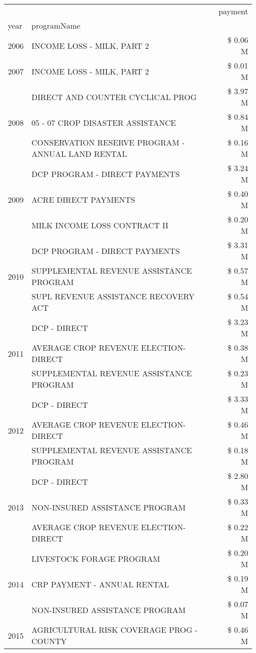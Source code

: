 \begin{tabular}{llr}
\toprule
 &  & payment \\
year & programName &  \\
\midrule
2006 & INCOME LOSS - MILK, PART 2 & \$ 0.06 M \\
\cline{1-3}
2007 & INCOME LOSS - MILK, PART 2 & \$ 0.01 M \\
\cline{1-3}
\multirow[t]{3}{*}{2008} & DIRECT AND COUNTER CYCLICAL PROG & \$ 3.97 M \\
 & 05 - 07 CROP DISASTER ASSISTANCE & \$ 0.84 M \\
 & CONSERVATION RESERVE PROGRAM - ANNUAL LAND RENTAL & \$ 0.16 M \\
\cline{1-3}
\multirow[t]{3}{*}{2009} & DCP PROGRAM - DIRECT PAYMENTS & \$ 3.24 M \\
 & ACRE DIRECT PAYMENTS & \$ 0.40 M \\
 & MILK INCOME LOSS CONTRACT II & \$ 0.20 M \\
\cline{1-3}
\multirow[t]{3}{*}{2010} & DCP PROGRAM - DIRECT PAYMENTS & \$ 3.31 M \\
 & SUPPLEMENTAL REVENUE ASSISTANCE PROGRAM & \$ 0.57 M \\
 & SUPL REVENUE ASSISTANCE RECOVERY ACT & \$ 0.54 M \\
\cline{1-3}
\multirow[t]{3}{*}{2011} & DCP - DIRECT & \$ 3.23 M \\
 & AVERAGE CROP REVENUE ELECTION-DIRECT & \$ 0.38 M \\
 & SUPPLEMENTAL REVENUE ASSISTANCE PROGRAM & \$ 0.23 M \\
\cline{1-3}
\multirow[t]{3}{*}{2012} & DCP - DIRECT & \$ 3.33 M \\
 & AVERAGE CROP REVENUE ELECTION-DIRECT & \$ 0.46 M \\
 & SUPPLEMENTAL REVENUE ASSISTANCE PROGRAM & \$ 0.18 M \\
\cline{1-3}
\multirow[t]{3}{*}{2013} & DCP - DIRECT & \$ 2.80 M \\
 & NON-INSURED ASSISTANCE PROGRAM & \$ 0.33 M \\
 & AVERAGE CROP REVENUE ELECTION-DIRECT & \$ 0.22 M \\
\cline{1-3}
\multirow[t]{3}{*}{2014} & LIVESTOCK FORAGE PROGRAM & \$ 0.20 M \\
 & CRP PAYMENT - ANNUAL RENTAL & \$ 0.19 M \\
 & NON-INSURED ASSISTANCE PROGRAM & \$ 0.07 M \\
\cline{1-3}
\multirow[t]{3}{*}{2015} & AGRICULTURAL RISK COVERAGE PROG - COUNTY & \$ 0.46 M \\

\end{tabular}
